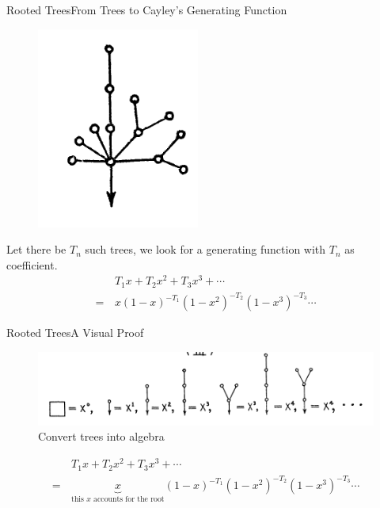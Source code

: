 \documentclass{beamer}
\begin{document}
    \begin{frame}{Rooted Trees}{From Trees to Cayley’s Generating Function}
        \begin{figure}
            \centering
            \includegraphics[scale=0.5]{images/rooted-tree.png}
            \label{fig:rooted-tree}
        \end{figure}
        Let there be $T_n$ such trees, we look for a generating function with 
        $T_n$ as coefficient.
        \begin{align} %
            & T_1x + T_2 x^2 + T_3 x^3 +\cdots \\
            =\,  & x(1-x)^{-T_1}(1-x^2)^{-T_2}(1-x^3)^{-T_3}\cdots
        \end{align}
    \end{frame}
    
    \begin{frame}{Rooted Trees}{A Visual Proof}
        \begin{figure}
            \centering
            \includegraphics[scale=0.5]{images/tree5.png}
            \caption{Convert trees into algebra}
            \label{fig:enter-label}
        \end{figure}
        \begin{align*}
            & T_1x + T_2 x^2 + T_3 x^3 +\cdots \\
            =\,  & \underbrace{x}_{\text{this $x$ accounts for the root}}(1-x)^{-T_1}(1-x^2)^{-T_2}(1-x^3)^{-T_3}\cdots
        \end{align*}
    \end{frame}
\end{document}
